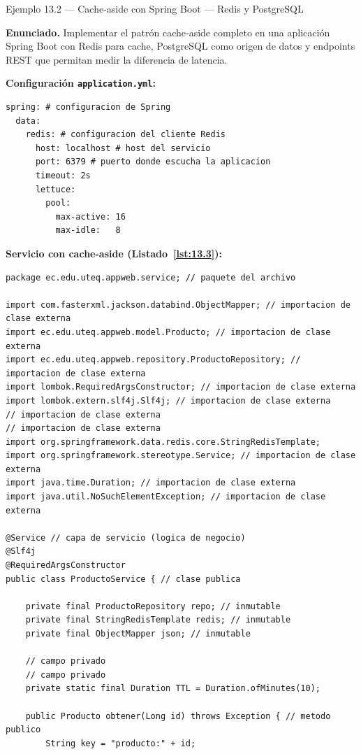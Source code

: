\begin{cajaejemplo}{Ejemplo 13.2 --- Cache-aside con Spring Boot --- Redis y PostgreSQL}


\textbf{Enunciado.} Implementar el patrón cache-aside completo en una aplicación Spring Boot con Redis para cache, PostgreSQL como origen de datos y endpoints REST que permitan medir la diferencia de latencia.

\textbf{Configuración \texttt{application.yml}:}
\begin{lstlisting}[style=yaml,numbers=none,caption={Ejemplo de YAML},label=lst:13.2]
spring: # configuracion de Spring
  data:
    redis: # configuracion del cliente Redis
      host: localhost # host del servicio
      port: 6379 # puerto donde escucha la aplicacion
      timeout: 2s
      lettuce:
        pool:
          max-active: 16
          max-idle:   8
\end{lstlisting}

\textbf{Servicio con cache-aside (Listado~\ref{lst:13.3}):}
\begin{lstlisting}[style=java,caption={ProductoService.java},label=lst:13.3]
package ec.edu.uteq.appweb.service; // paquete del archivo

import com.fasterxml.jackson.databind.ObjectMapper; // importacion de clase externa
import ec.edu.uteq.appweb.model.Producto; // importacion de clase externa
import ec.edu.uteq.appweb.repository.ProductoRepository; // importacion de clase externa
import lombok.RequiredArgsConstructor; // importacion de clase externa
import lombok.extern.slf4j.Slf4j; // importacion de clase externa
// importacion de clase externa
// importacion de clase externa
import org.springframework.data.redis.core.StringRedisTemplate;
import org.springframework.stereotype.Service; // importacion de clase externa
import java.time.Duration; // importacion de clase externa
import java.util.NoSuchElementException; // importacion de clase externa

@Service // capa de servicio (logica de negocio)
@Slf4j
@RequiredArgsConstructor
public class ProductoService { // clase publica

    private final ProductoRepository repo; // inmutable
    private final StringRedisTemplate redis; // inmutable
    private final ObjectMapper json; // inmutable

    // campo privado
    // campo privado
    private static final Duration TTL = Duration.ofMinutes(10);

    public Producto obtener(Long id) throws Exception { // metodo publico
        String key = "producto:" + id;


\end{lstlisting}
\end{cajaejemplo}
